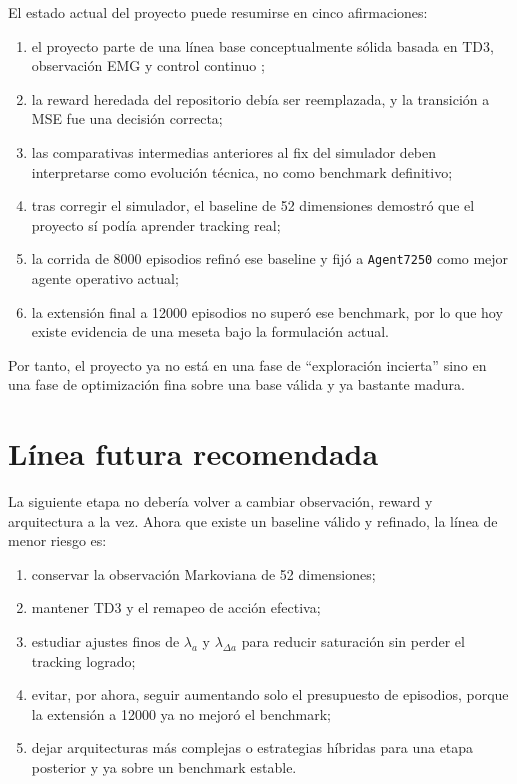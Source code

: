 \documentclass[11pt,a4paper]{article}
\begin{document}
El estado actual del proyecto puede resumirse en cinco afirmaciones:
\begin{enumerate}[leftmargin=1.2cm]
    \item el proyecto parte de una l\'inea base conceptualmente s\'olida basada en TD3, observaci\'on EMG y control continuo \citep{fuertes2026continuous};
    \item la reward heredada del repositorio deb\'ia ser reemplazada, y la transici\'on a MSE fue una decisi\'on correcta;
    \item las comparativas intermedias anteriores al fix del simulador deben interpretarse como evoluci\'on t\'ecnica, no como benchmark definitivo;
    \item tras corregir el simulador, el baseline de 52 dimensiones demostr\'o que el proyecto s\'i pod\'ia aprender tracking real;
    \item la corrida de 8000 episodios refin\'o ese baseline y fij\'o a \texttt{Agent7250} como mejor agente operativo actual;
    \item la extensi\'on final a 12000 episodios no super\'o ese benchmark, por lo que hoy existe evidencia de una meseta bajo la formulaci\'on actual.
\end{enumerate}

Por tanto, el proyecto ya no est\'a en una fase de ``exploraci\'on incierta'' sino en una fase de optimizaci\'on fina sobre una base v\'alida y ya bastante madura.

\section{L\'inea futura recomendada}

La siguiente etapa no deber\'ia volver a cambiar observaci\'on, reward y arquitectura a la vez. Ahora que existe un baseline v\'alido y refinado, la l\'inea de menor riesgo es:
\begin{enumerate}[leftmargin=1.2cm]
    \item conservar la observaci\'on Markoviana de 52 dimensiones;
    \item mantener TD3 y el remapeo de acci\'on efectiva;
    \item estudiar ajustes finos de \(\lambda_a\) y \(\lambda_{\Delta a}\) para reducir saturaci\'on sin perder el tracking logrado;
    \item evitar, por ahora, seguir aumentando solo el presupuesto de episodios, porque la extensi\'on a 12000 ya no mejor\'o el benchmark;
    \item dejar arquitecturas m\'as complejas o estrategias h\'ibridas para una etapa posterior y ya sobre un benchmark estable.
\end{enumerate}
\end{document}

